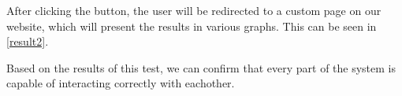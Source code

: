 
After clicking the button, the user will be redirected to a custom page on our
website, which will present the results in various graphs. This can be seen in
\autoref{result2}.\nl


Based on the results of this test, we can confirm that every part of the system
is capable of interacting correctly with eachother.





